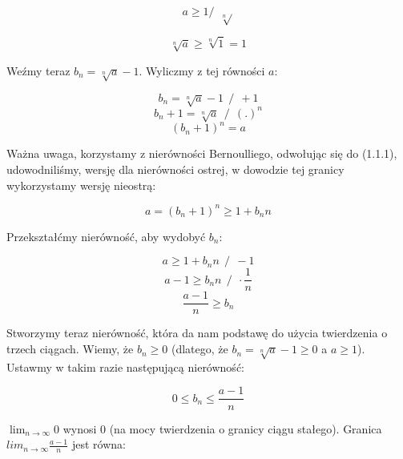 \documentclass[a4paper,oneside,openright,11pt]{article}
\numberwithin{equation}{section}
\begin{document}
\begin{equation*}
    a \geq 1 / \ \ \sqrt[n]{}
\end{equation*}

\begin{equation*}
    \sqrt[n]{a} \geq \sqrt[n]{1} = 1 
\end{equation*}

\noindent
Weźmy teraz $b_{n} = \sqrt[n]{a} - 1$. Wyliczmy z tej równości $a$:

\begin{equation*}
    b_{n} = \sqrt[n]{a} - 1 \ \ / \ \ +1
\end{equation*}
\begin{equation*}
    b_{n} + 1 = \sqrt[n]{a} \ \ / \ \ (.)^{n}
\end{equation*}
\begin{equation*}
    (b_{n} + 1)^{n} = a 
\end{equation*}

Ważna uwaga, korzystamy z nierówności Bernoulliego, odwołując się do (1.1.1), udowodniliśmy, wersję dla nierówności ostrej, w dowodzie tej granicy wykorzystamy wersję nieostrą:

\begin{equation*}
    a = (b_{n} + 1)^{n} \geq 1 + b_{n}n
\end{equation*}

\noindent
Przekształćmy nierówność, aby wydobyć $b_{n}$:

\begin{equation*}
    a \geq 1 + b_{n}n \ \ / \ \ -1
\end{equation*}
\begin{equation*}
    a - 1 \geq b_{n}n \ \ / \ \ \cdot \frac{1}{n}
\end{equation*}
\begin{equation*}
    \frac{a - 1}{n} \geq b_{n}
\end{equation*}

\noindent
Stworzymy teraz nierówność, która da nam podstawę do użycia twierdzenia o trzech ciągach. Wiemy, że $b_{n} \geq 0$ (dlatego, że $b_{n} = \sqrt[n]{a} - 1 \geq 0$ a $a \geq 1$).
Ustawmy w takim razie następującą nierówność:

\begin{equation*}
    0 \leq b_{n} \leq \frac{a - 1}{n}
\end{equation*}

\noindent
$\lim_{n\to\infty} 0$ wynosi $0$ (na mocy twierdzenia o granicy ciągu stałego). Granica $lim_{n\to\infty} \frac{a - 1}{n}$ jest równa:
\end{document}
